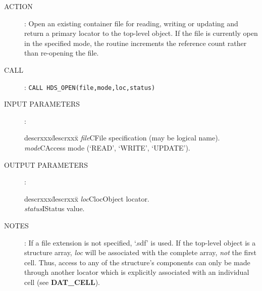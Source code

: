 \begin{description}
\item [ACTION]:
Open an existing container file for reading, writing or updating and return
a primary locator to the top-level object.
If the file is currently open in the specified mode, the routine increments
the reference count rather than re-opening the file.
\item [CALL]:
{\tt CALL HDS\_OPEN(file,mode,loc,status)}
\item [INPUT PARAMETERS]:
\begin{tabbing}
descrxxx\=descrxxx\=\kill
{\em file}\>C\>File specification (may be logical name).\\
{\em mode}\>C\>Access mode (`READ', `WRITE', `UPDATE').
\end{tabbing}
\item [OUTPUT PARAMETERS]:
\begin{tabbing}
descrxxx\=descrxxx\=\kill
{\em loc}\>Cloc\>Object locator.\\
{\em status}\>I\>Status value.
\end{tabbing}
\item [NOTES]:
If a file extension is not specified, `.sdf' is used.
If the top-level object is a structure array, {\em loc} will be associated with
the complete array, {\em not} the first cell.
Thus, access to any of the structure's components can only be made through
another locator which is explicitly associated with an individual cell
(see {\bf DAT\_CELL}).
\end{description}
\goodbreak

